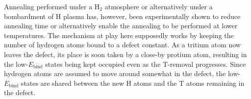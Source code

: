 Annealing performed under a H$_2$ atmosphere or alternatively under a bombardment of H plasma has, however, been experimentally shown to reduce annealing time or alternatively enable the annealing to be performed at lower temperatures.  \cite{alimov2011hydrogen, roth2013hydrogen, barton2014deuterium, ahlgren2019hydrogen}
The mechanism at play here supposedly works by keeping the number of hydrogen atoms bound to a defect constant.  
As a tritium atom now leaves the defect, its place is soon taken by a close-by protium atom, resulting in the low-$E_{\text{bind}}$ states being kept occupied even as the T-removal progresses.
Since hydrogen atoms are assumed to move around somewhat in the defect, the low-$E_{\text{bind}}$ states are shared between the new H atoms and the T atoms remaining in the defect.


